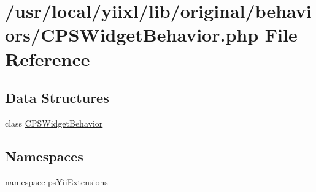 \hypertarget{CPSWidgetBehavior_8php}{
\section{/usr/local/yiixl/lib/original/behaviors/CPSWidgetBehavior.php File Reference}
\label{CPSWidgetBehavior_8php}
}
\subsection*{Data Structures}
\begin{DoxyCompactItemize}
\item 
class \hyperlink{classCPSWidgetBehavior}{CPSWidgetBehavior}
\end{DoxyCompactItemize}
\subsection*{Namespaces}
\begin{DoxyCompactItemize}
\item 
namespace \hyperlink{namespacepsYiiExtensions}{psYiiExtensions}
\end{DoxyCompactItemize}
